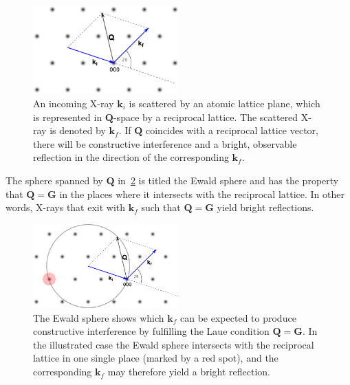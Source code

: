 \documentclass[11pt,twoside]{report}
\begin{document}
\begin{figure}[htbp]
	\begin{center}
		\includegraphics[width=0.5\textwidth]{img/scattering.pdf}			
	\end{center}
	\vspace{-10pt}
	\caption{An incoming X-ray  ${\mathbf k}_{i}$ is scattered by an atomic lattice plane, which is represented in ${\mathbf Q}$-space by a reciprocal lattice. The scattered X-ray is denoted by ${\mathbf k}_{f}$. If ${\mathbf Q}$ coincides with a reciprocal lattice vector, there will be constructive interference and a bright, observable reflection in the direction of the corresponding ${\mathbf k}_{f}$.  \label{fig:scattering}}
\end{figure}



The sphere spanned by ${\mathbf Q}$ in~\cref{fig:scattering_ewald} is titled the Ewald sphere and has the property that ${\mathbf Q} = {\mathbf G}$ in the places where it intersects with the reciprocal lattice. In other words, X-rays that exit with ${\mathbf k}_{f}$ such that ${\mathbf Q} = {\mathbf G}$ yield bright reflections. 

\begin{figure}[htbp]
	\begin{center}
		\includegraphics[width=0.5\textwidth]{img/scattering_ewald.pdf}		
	\end{center}
	\vspace{-10pt}
	\caption{The Ewald sphere shows which ${\mathbf k}_{f}$ can be expected to produce constructive interference by fulfilling the Laue condition ${\mathbf Q} = {\mathbf G}$. In the illustrated case the Ewald sphere intersects with the reciprocal lattice in one single place (marked by a red spot), and the corresponding ${\mathbf k}_{f}$ may therefore yield a bright reflection.\label{fig:scattering_ewald}}
\end{figure}
\end{document}
